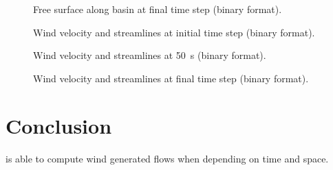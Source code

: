 \begin{figure}[H]
 \centering
 \caption{Free surface along basin at final time step (binary format).}
 \label{t2d:windtxy:fig:FreeSurfbintf}
\end{figure}

\begin{figure}[H]
 \centering
 \caption{Wind velocity and streamlines at initial time step (binary format).}
 \label{t2d:windtxy:fig:Velobin0}
\end{figure}

\begin{figure}[H]
 \centering
 \caption{Wind velocity and streamlines at 50~s (binary format).}
 \label{t2d:windtxy:fig:Velobin50s}
\end{figure}

\begin{figure}[H]
 \centering
 \caption{Wind velocity and streamlines at final time step (binary format).}
 \label{t2d:windtxy:fig:Velobintf}
\end{figure}

\section{Conclusion}
 is able to compute wind generated flows when depending on time and space.
